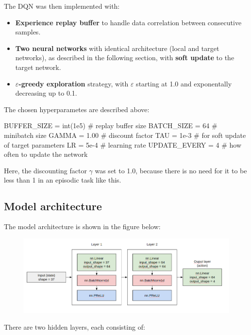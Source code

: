 \documentclass{article}
\begin{document}
The DQN was then implemented with:

\begin{itemize}
    \item \textbf{Experience replay buffer} to handle data correlation between consecutive samples.
    \item \textbf{Two neural networks} with identical architecture (local and target networks), as described in the following section, with \textbf{soft update} to the target network.
    \item \textbf{$\varepsilon$-greedy exploration} strategy, with $\varepsilon$ starting at 1.0 and exponentally decreasing up to 0.1.
\end{itemize}

The chosen hyperparametes are described above:

\begin{code}[Python]
BUFFER_SIZE = int(1e5)  # replay buffer size
BATCH_SIZE = 64         # minibatch size
GAMMA = 1.00            # discount factor
TAU = 1e-3              # for soft update of target parameters
LR = 5e-4               # learning rate 
UPDATE_EVERY = 4        # how often to update the network
\end{code}

Here, the discounting factor $\gamma$ was set to 1.0, because there is no need for it to be less than 1 in an episodic task like this.

\subsection{Model architecture}

The model architecture is shown in the figure below:

\begin{figure}[H]
\centering
\includegraphics[scale=0.45]{img/model_arch.png}
\label{fig:model_arch}
\end{figure}

There are two hidden layers, each consisting of:
\end{document}
